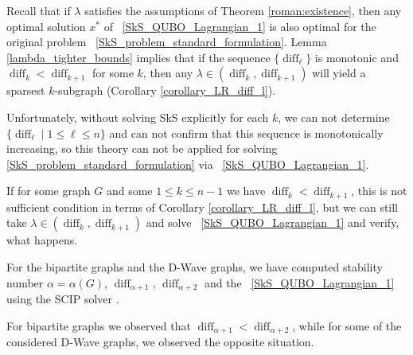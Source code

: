 \documentclass{article}
\DeclareMathOperator{\diff}{diff}
\begin{document}




Recall that  if $\lambda$  satisfies the assumptions of Theorem \ref{roman:existence}, then any optimal solution $x^*$ of ~\eqref{SkS_QUBO_Lagrangian_1} is also optimal for the original problem ~\eqref{SkS_problem_standard_formulation}.
Lemma \ref{lambda_tighter_bounds} implies that if the sequence $\{\diff_\ell\} $ is monotonic and  $\diff_k < \diff_{k+1}$ for some $k$, then any $\lambda \in (\diff_k, \diff_{k+1})$ will yield a sparsest $k$-subgraph (Corollary \ref{corollary_LR_diff_l}).

Unfortunately, without solving  SkS
explicitly for each $k$, we can not determine $\{\diff_\ell\mid 1\le \ell\le n \}$ and can not confirm that this sequence is monotonically increasing, so this theory can  not be applied   for solving 
\eqref{SkS_problem_standard_formulation} via ~\eqref{SkS_QUBO_Lagrangian_1}.

If for some graph $G$ and some $1\le k\le n-1$ we have
$\diff_k<\diff_{k+1}$, this is not sufficient condition in terms of 
Corollary \ref{corollary_LR_diff_l}, but we can still take 
$\lambda \in (\diff_k,\diff_{k+1})$ and solve ~\eqref{SkS_QUBO_Lagrangian_1} and verify, what happens.

For the bipartite graphs and the D-Wave graphs, we have computed stability number $\alpha=\alpha(G)$,  $\diff_{\alpha+1}$, $\diff_{\alpha+2}$ and the ~\eqref{SkS_QUBO_Lagrangian_1} using the SCIP solver \cite{SCIP}.

For bipartite graphs we observed that $\diff_{\alpha+1}<\diff_{\alpha+2}$,
while for some of the considered D-Wave graphs, we observed the opposite situation.
\end{document}

